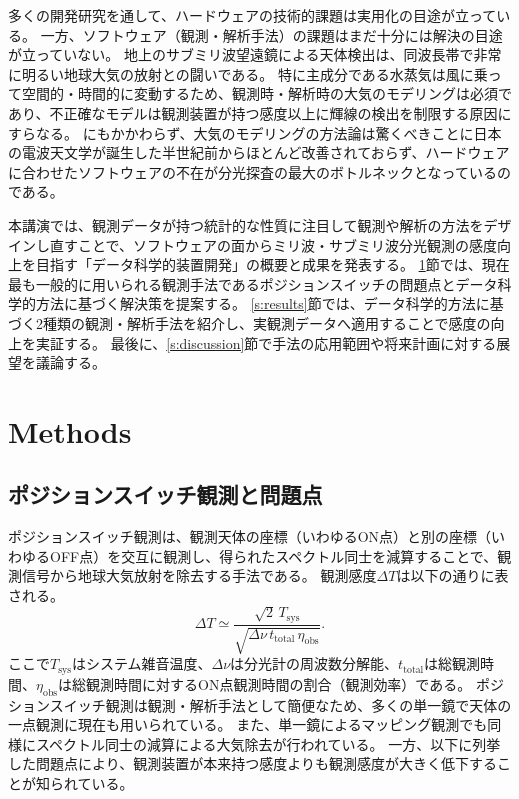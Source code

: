 \documentclass[a4paper,10pt,oneside,twocolumn,notitlepage,final]{jarticle}
\newcommand{\subrm}[1]{_{\mathrm{#1}}}
\begin{document}
多くの開発研究を通して、ハードウェアの技術的課題は実用化の目途が立っている。
一方、ソフトウェア（観測・解析手法）の課題はまだ十分には解決の目途が立っていない。
地上のサブミリ波望遠鏡による天体検出は、同波長帯で非常に明るい地球大気の放射との闘いである。
特に主成分である水蒸気は風に乗って空間的・時間的に変動するため、観測時・解析時の大気のモデリングは必須であり、不正確なモデルは観測装置が持つ感度以上に輝線の検出を制限する原因にすらなる。
にもかかわらず、大気のモデリングの方法論は驚くべきことに日本の電波天文学が誕生した半世紀前からほとんど改善されておらず、ハードウェアに合わせたソフトウェアの不在が分光探査の最大のボトルネックとなっているのである。


本講演では、観測データが持つ統計的な性質に注目して観測や解析の方法をデザインし直すことで、ソフトウェアの面からミリ波・サブミリ波分光観測の感度向上を目指す「データ科学的装置開発」の概要と成果を発表する。
\ref{s:methods}節では、現在最も一般的に用いられる観測手法であるポジションスイッチの問題点とデータ科学的方法に基づく解決策を提案する。
\ref{s:results}節では、データ科学的方法に基づく2種類の観測・解析手法を紹介し、実観測データへ適用することで感度の向上を実証する。
最後に、\ref{s:discussion}節で手法の応用範囲や将来計画に対する展望を議論する。


\section{Methods}
\label{s:methods}

\subsection{ポジションスイッチ観測と問題点}

ポジションスイッチ観測は、観測天体の座標（いわゆるON点）と別の座標（いわゆるOFF点）を交互に観測し、得られたスペクトル同士を減算することで、観測信号から地球大気放射を除去する手法である。
観測感度$\Delta T$は以下の通りに表される。
\begin{equation}
    \Delta T
    \simeq\frac{\sqrt{2}\,T\subrm{sys}}{\sqrt{\Delta\nu\, t\subrm{total}\, \eta\subrm{obs}}}.
    \label{eq:psw-sensitivity}
\end{equation}
ここで$T\subrm{sys}$はシステム雑音温度、$\Delta\nu$は分光計の周波数分解能、$t\subrm{total}$は総観測時間、$\eta\subrm{obs}$は総観測時間に対するON点観測時間の割合（観測効率）である。
ポジションスイッチ観測は観測・解析手法として簡便なため、多くの単一鏡で天体の一点観測に現在も用いられている。
また、単一鏡によるマッピング観測でも同様にスペクトル同士の減算による大気除去が行われている。
一方、以下に列挙した問題点により、観測装置が本来持つ感度よりも観測感度が大きく低下することが知られている。
\end{document}
